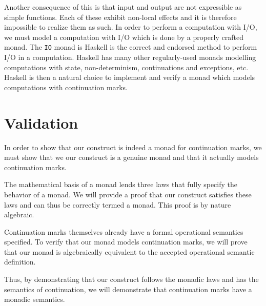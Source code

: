 \documentclass[ms]{byuprop}
\newcounter{definition}
\begin{document}

Another consequence of this is that input and output are not expressible as simple
functions. Each of these exhibit non-local effects and it is therefore impossible to
realize them as such. In order to perform a computation with I/O, we must model a
computation with I/O which is done by a properly crafted monad. The \texttt{IO} monad is
Haskell is the correct and endorsed method to perform I/O in a computation. Haskell has
many other regularly-used monads modelling computations with state, non-determinism,
continuations and exceptions, etc. Haskell is then a natural choice to implement and
verify a monad which models computations with continuation marks.

\section{Validation}


In order to show that our construct is indeed a monad for continuation marks, we must show
that we our construct is a genuine monad and that it actually models continuation marks.

The mathematical basis of a monad lends three laws that fully specify the behavior of a 
monad. We will provide a proof that our construct satisfies these laws and can thus be 
correctly termed a monad. This proof is by nature algebraic.

Continuation marks themselves already have a formal operational semantics specified. To 
verify that our monad models continuation marks, we will prove that our monad is 
algebraically equivalent to the accepted operational semantic definition.

Thus, by demonstrating that our construct follows the monadic laws and has the semantics
of continuation, we will demonstrate that continuation marks have a monadic semantics.

\end{document}
